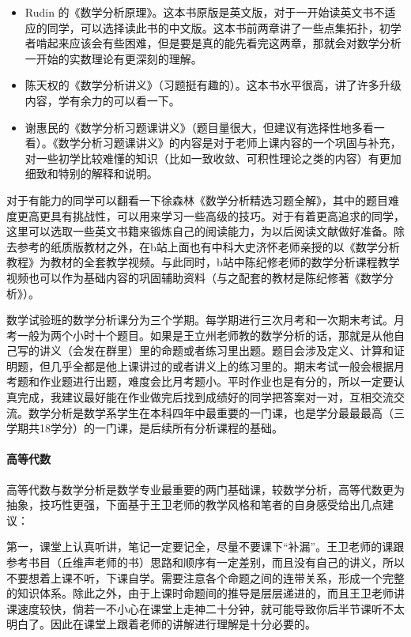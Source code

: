 \documentclass[
decoration,  %
]{qyxf-book}
\begin{document}
\begin{itemize}
	\item Rudin 的《数学分析原理》。这本书原版是英文版，对于一开始读英文书不适应的同学，可以选择读此书的中文版。这本书前两章讲了一些点集拓扑，初学者啃起来应该会有些困难，但是要是真的能先看完这两章，那就会对数学分析一开始的实数理论有更深刻的理解。
	\item 陈天权的《数学分析讲义》（习题挺有趣的）。这本书水平很高，讲了许多升级内容，学有余力的可以看一下。
	\item 谢惠民的《数学分析习题课讲义》（题目量很大，但建议有选择性地多看一看）。《数学分析习题课讲义》的内容是对于老师上课内容的一个巩固与补充，对一些初学比较难懂的知识（比如一致收敛、可积性理论之类的内容）有更加细致和特别的解释和说明。
\end{itemize}

对于有能力的同学可以翻看一下徐森林《数学分析精选习题全解》，其中的题目难度更高更具有挑战性，可以用来学习一些高级的技巧。对于有着更高追求的同学，这里可以选取一些英文书籍来锻炼自己的阅读能力，为以后阅读文献做好准备。除去参考的纸质版教材之外，在b站上面也有中科大史济怀老师亲授的以《数学分析教程》为教材的全套教学视频。与此同时，b站中陈纪修老师的数学分析课程教学视频也可以作为基础内容的巩固辅助资料（与之配套的教材是陈纪修著《数学分析》）。

数学试验班的数学分析课分为三个学期。每学期进行三次月考和一次期末考试。月考一般为两个小时十个题目。如果是王立州老师教的数学分析的话，那就是从他自己写的讲义（会发在群里）里的命题或者练习里出题。题目会涉及定义、计算和证明题，但几乎全都是他上课讲过的或者讲义上的练习里的。期末考试一般会根据月考题和作业题进行出题，难度会比月考题小。平时作业也是有分的，所以一定要认真完成，我建议最好能在作业做完后找到成绩好的同学把答案对一对，互相交流交流。数学分析是数学系学生在本科四年中最重要的一门课，也是学分最最最高（三学期共18学分）的一门课，是后续所有分析课程的基础。

\paragraph{高等代数}
高等代数与数学分析是数学专业最重要的两门基础课，较数学分析，高等代数更为抽象，技巧性更强，下面基于王卫老师的教学风格和笔者的自身感受给出几点建议：

第一，课堂上认真听讲，笔记一定要记全，尽量不要课下“补漏”。王卫老师的课跟参考书目（丘维声老师的书）思路和顺序有一定差别，而且没有自己的讲义，所以不要想着上课不听，下课自学。需要注意各个命题之间的连带关系，形成一个完整的知识体系。除此之外，由于上课时命题间的推导是层层递进的，而且王卫老师讲课速度较快，倘若一不小心在课堂上走神二十分钟，就可能导致你后半节课听不太明白了。因此在课堂上跟着老师的讲解进行理解是十分必要的。
\end{document}
